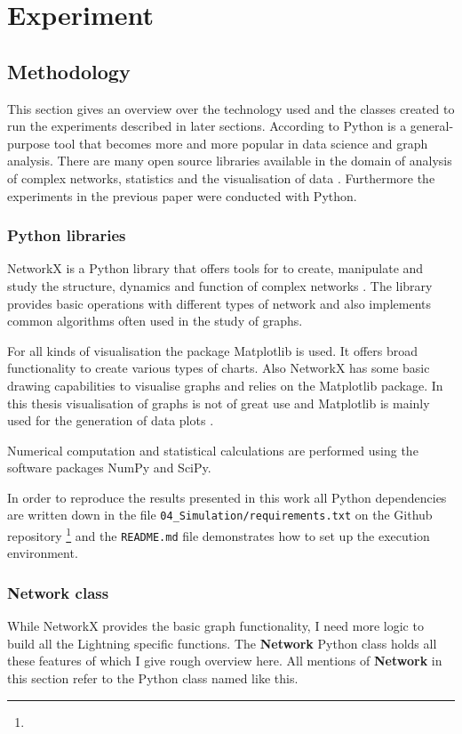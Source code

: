 \documentclass[final]{fhnwreport}       %
\begin{document}
\section{Experiment}\label{sec:method}
\subsection{Methodology}
This section gives an overview over the technology used and the classes created to run the experiments described in later sections. According to \citeauthor{al-taie_python_2017} Python is a general-purpose tool that becomes more and more popular in data science and graph analysis. There are many open source libraries available in the domain of analysis of complex networks, statistics and the visualisation of data \citep{al-taie_python_2017}. Furthermore the experiments in the previous paper were conducted with Python. 

\subsubsection{Python libraries}
NetworkX is a Python library that offers tools for to create, manipulate and study the structure, dynamics and function of complex networks \citep{al-taie_python_2017}. The library provides basic operations with different types of network and also implements common algorithms often used in the study of graphs.  

For all kinds of visualisation the package Matplotlib is used. It offers broad functionality to create various types of charts. Also NetworkX has some basic drawing capabilities to visualise graphs and relies on the Matplotlib package. In this thesis visualisation of graphs is not of great use and Matplotlib is mainly used for the generation of data plots \citep{al-taie_python_2017}.

Numerical computation and statistical calculations are performed using the software packages NumPy and SciPy. 

In order to reproduce the results presented in this work all Python dependencies are written down in the file \texttt{04\_Simulation/requirements.txt} on the Github repository \footnote{\github} and the \texttt{README.md} file demonstrates how to set up the execution environment.

\subsubsection{Network class}
While NetworkX provides the basic graph functionality, I need more logic to build all the Lightning specific functions. The \textbf{Network} Python class holds all these features of which I give rough overview here. All mentions of \textbf{Network} in this section refer to the Python class named like this.
\end{document}
